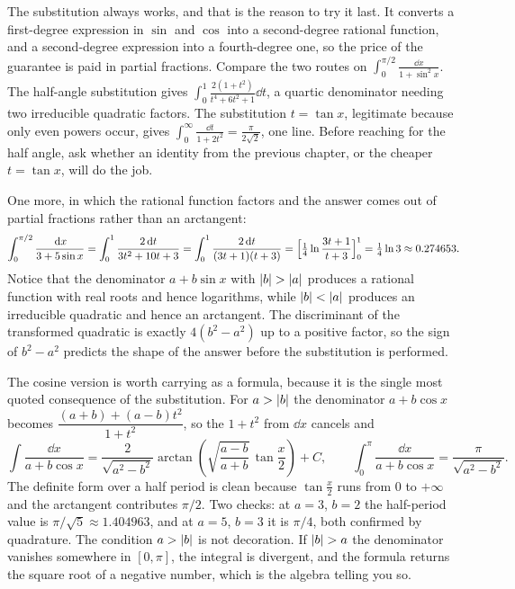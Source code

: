 \begin{keynote}
The substitution always works, and that is the reason to try it last. It converts a first-degree expression in $\sin$ and $\cos$ into a second-degree rational function, and a second-degree expression into a fourth-degree one, so the price of the guarantee is paid in partial fractions. Compare the two routes on $\displaystyle\int_0^{\pi/2}\frac{\dd x}{1+\sin^2x}$. The half-angle substitution gives $\displaystyle\int_0^{1}\frac{2(1+t^2)}{t^4+6t^2+1}\dd t$, a quartic denominator needing two irreducible quadratic factors. The substitution $t=\tan x$, legitimate because only even powers occur, gives $\displaystyle\int_0^{\infty}\frac{\dd t}{1+2t^2}=\frac{\pi}{2\sqrt2}$, one line. Before reaching for the half angle, ask whether an identity from the previous chapter, or the cheaper $t=\tan x$, will do the job.
\end{keynote}

One more, in which the rational function factors and the answer comes out of partial fractions rather than an arctangent:
\[
\int_0^{\pi/2}\frac{\,\mathrm{d} x}{3+5\sin x}=\int_0^1\frac{2\,\mathrm{d} t}{3t^2+10t+3}=\int_0^1\frac{2\,\mathrm{d} t}{(3t+1)(t+3)}
=\Bigl[\tfrac14\ln\frac{3t+1}{t+3}\Bigr]_0^1=\tfrac14\ln3\approx0.274653 .
\]
Notice that the denominator $a+b\sin x$ with $\left\lvert b\right\rvert>\left\lvert a\right\rvert$ produces a rational function with real roots and hence logarithms, while $\left\lvert b\right\rvert<\left\lvert a\right\rvert$ produces an irreducible quadratic and hence an arctangent. The discriminant of the transformed quadratic is exactly $4(b^2-a^2)$ up to a positive factor, so the sign of $b^2-a^2$ predicts the shape of the answer before the substitution is performed.

The cosine version is worth carrying as a formula, because it is the single most quoted consequence of the substitution. For $a>\left\lvert b\right\rvert$ the denominator $a+b\cos x$ becomes $\dfrac{(a+b)+(a-b)t^2}{1+t^2}$, so the $1+t^2$ from $\dd x$ cancels and
\[
\int\frac{\dd x}{a+b\cos x}=\frac{2}{\sqrt{a^2-b^2}}\arctan\left(\sqrt{\frac{a-b}{a+b}}\,\tan\frac x2\right)+C ,
\qquad
\int_0^{\pi}\frac{\dd x}{a+b\cos x}=\frac{\pi}{\sqrt{a^2-b^2}} .
\]
The definite form over a half period is clean because $\tan\tfrac x2$ runs from $0$ to $+\infty$ and the arctangent contributes $\pi/2$. Two checks: at $a=3$, $b=2$ the half-period value is $\pi/\sqrt5\approx1.404963$, and at $a=5$, $b=3$ it is $\pi/4$, both confirmed by quadrature. The condition $a>\left\lvert b\right\rvert$ is not decoration. If $\left\lvert b\right\rvert>a$ the denominator vanishes somewhere in $[0,\pi]$, the integral is divergent, and the formula returns the square root of a negative number, which is the algebra telling you so.


